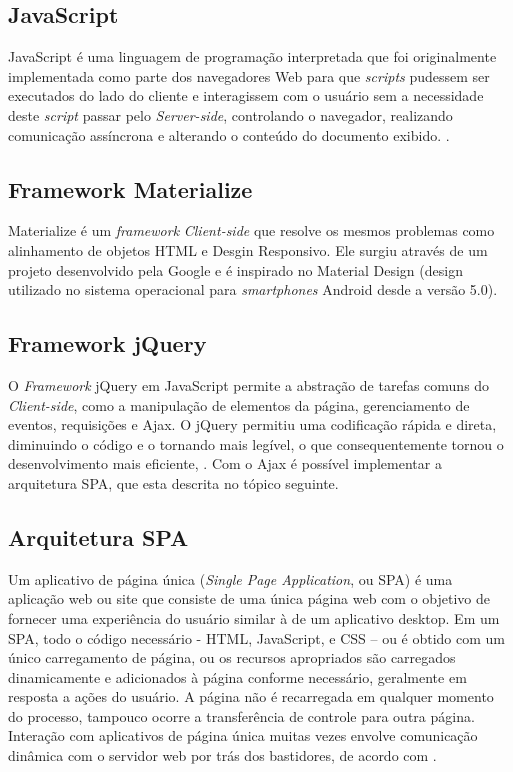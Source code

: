 \subsection{JavaScript}

JavaScript é uma linguagem de programação interpretada que foi originalmente implementada como parte dos navegadores Web para que \textit{scripts} pudessem ser executados do lado do cliente e interagissem com o usuário sem a necessidade deste \textit{script} passar pelo \textit{Server-side}, controlando o navegador, realizando comunicação assíncrona e alterando o conteúdo do documento exibido. \cite{flanagan2007javascript-UPPERCASE}.

\subsection{Framework Materialize}

Materialize é um \textit{framework} \textit{Client-side} que resolve os mesmos problemas como alinhamento de objetos HTML e Desgin Responsivo. Ele surgiu através de um projeto desenvolvido pela Google e é inspirado no Material Design (design utilizado no sistema operacional para \textit{smartphones} Android desde a versão 5.0).

\subsection{Framework {j}Query}

O \textit{Framework} jQuery em JavaScript permite a abstração de tarefas comuns do \textit{Client-side}, como a manipulação de elementos da página, gerenciamento de eventos, requisições e Ajax. O jQuery permitiu uma codificação rápida e direta, diminuindo o código e o tornando mais legível, o que consequentemente tornou o desenvolvimento mais eficiente, \cite{duckett2018javascript}. Com o Ajax é possível implementar a arquitetura SPA, que esta descrita no tópico seguinte.

\subsection{Arquitetura SPA}

Um aplicativo de página única (\textit{Single Page Application}, ou SPA) é uma aplicação web ou site que consiste de uma única página web com o objetivo de fornecer uma experiência do usuário similar à de um aplicativo desktop. Em um SPA, todo o código necessário - HTML, JavaScript, e CSS – ou é obtido com um único carregamento de página, ou os recursos apropriados são carregados dinamicamente e adicionados à página conforme necessário, geralmente em resposta a ações do usuário. A página não é recarregada em qualquer momento do processo, tampouco ocorre a transferência de controle para outra página. Interação com aplicativos de página única muitas vezes envolve comunicação dinâmica com o servidor web por trás dos bastidores, de acordo com .

